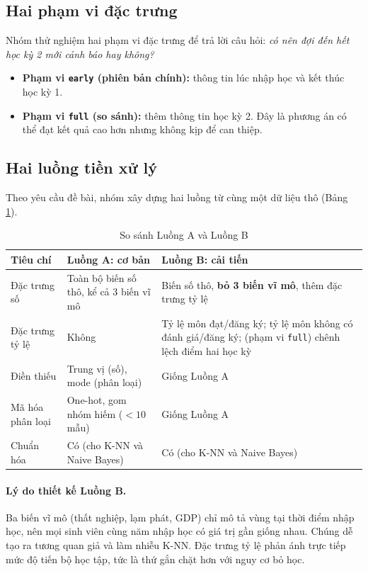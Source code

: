 \documentclass[12pt,a4paper]{article}
\begin{document}
\subsection{Hai phạm vi đặc trưng}
Nhóm thử nghiệm hai phạm vi đặc trưng để trả lời câu hỏi: \emph{có nên đợi đến hết học kỳ 2 mới cảnh báo hay không?}
\begin{itemize}
  \item \textbf{Phạm vi \texttt{early} (phiên bản chính):} thông tin lúc nhập học và kết thúc học kỳ 1.
  \item \textbf{Phạm vi \texttt{full} (so sánh):} thêm thông tin học kỳ 2. Đây là phương án có thể đạt kết quả cao hơn nhưng không kịp để can thiệp.
\end{itemize}

\subsection{Hai luồng tiền xử lý}
Theo yêu cầu đề bài, nhóm xây dựng hai luồng từ cùng một dữ liệu thô (Bảng \ref{tab:flow}).

\begin{table}[H]
\centering
\caption{So sánh Luồng A và Luồng B}
\label{tab:flow}
\begin{tabular}{p{2.6cm}p{5.4cm}p{5.4cm}}
\toprule
Tiêu chí & Luồng A: cơ bản & Luồng B: cải tiến \\
\midrule
Đặc trưng số & Toàn bộ biến số thô, kể cả 3 biến vĩ mô & Biến số thô, \textbf{bỏ 3 biến vĩ mô}, thêm đặc trưng tỷ lệ \\
Đặc trưng tỷ lệ & Không & Tỷ lệ môn đạt/đăng ký; tỷ lệ môn không có đánh giá/đăng ký; (phạm vi \texttt{full}) chênh lệch điểm hai học kỳ \\
Điền thiếu & Trung vị (số), mode (phân loại) & Giống Luồng A \\
Mã hóa phân loại & One-hot, gom nhóm hiếm ($<10$ mẫu) & Giống Luồng A \\
Chuẩn hóa & Có (cho K-NN và Naive Bayes) & Có (cho K-NN và Naive Bayes) \\
\bottomrule
\end{tabular}
\end{table}

\paragraph{Lý do thiết kế Luồng B.} Ba biến vĩ mô (thất nghiệp, lạm phát, GDP) chỉ mô tả vùng tại thời điểm nhập học, nên mọi sinh viên cùng năm nhập học có giá trị gần giống nhau. Chúng dễ tạo ra tương quan giả và làm nhiễu K-NN. Đặc trưng tỷ lệ phản ánh trực tiếp mức độ tiến bộ học tập, tức là thứ gắn chặt hơn với nguy cơ bỏ học.
\end{document}
